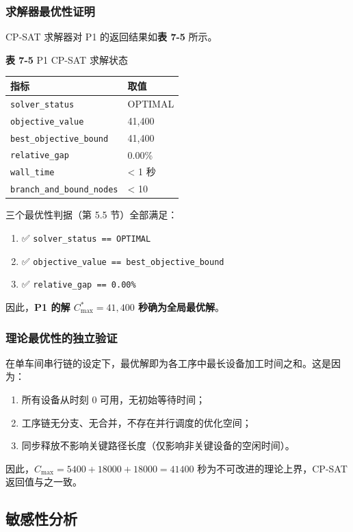 \documentclass[UTF8,a4paper,12pt]{ctexart}
\begin{document}
\subsubsection{求解器最优性证明}
CP-SAT 求解器对 P1 的返回结果如\textbf{表 7-5} 所示。

\begin{center}
\textbf{表 7-5} P1 CP-SAT 求解状态
\begin{tabular}{ll}
\toprule
指标 & 取值 \\
\midrule
\texttt{solver\_status} & OPTIMAL \\
\texttt{objective\_value} & 41,400 \\
\texttt{best\_objective\_bound} & 41,400 \\
\texttt{relative\_gap} & 0.00\% \\
\texttt{wall\_time} & < 1 秒 \\
\texttt{branch\_and\_bound\_nodes} & < 10 \\
\bottomrule
\end{tabular}
\end{center}

三个最优性判据（第 5.5 节）全部满足：
\begin{enumerate}
\item ✅ \texttt{solver\_status == OPTIMAL}
\item ✅ \texttt{objective\_value == best\_objective\_bound}
\item ✅ \texttt{relative\_gap == 0.00\%}
\end{enumerate}

因此，\textbf{P1 的解 $C_{\max}^* = 41{,}400$ 秒确为全局最优解}。

\subsubsection{理论最优性的独立验证}
在单车间串行链的设定下，最优解即为各工序中最长设备加工时间之和。这是因为：
\begin{enumerate}
\item 所有设备从时刻 0 可用，无初始等待时间；
\item 工序链无分支、无合并，不存在并行调度的优化空间；
\item 同步释放不影响关键路径长度（仅影响非关键设备的空闲时间）。
\end{enumerate}

因此，$C_{\max} = 5400 + 18000 + 18000 = 41400$ 秒为不可改进的理论上界，CP-SAT 返回值与之一致。

\subsection{敏感性分析}
\end{document}
